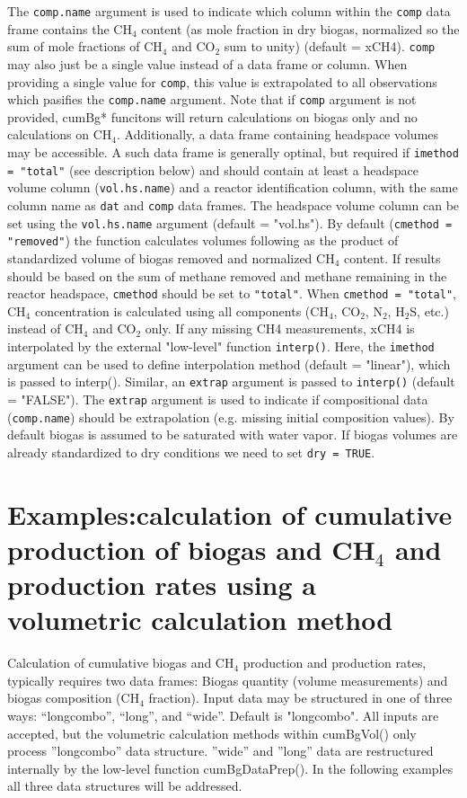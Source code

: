\documentclass{article}
\begin{document}
The \texttt{comp.name} argument is used to indicate which column within the \texttt{comp} data frame contains the CH$_4$ content (as mole fraction in dry biogas, normalized so the sum of mole fractions of CH$_4$ and CO$_2$ sum to unity) (default = xCH4). \texttt{comp} may also just be a single value instead of a data frame or column. When providing a single value for \texttt{comp}, this value is extrapolated to all observations which pasifies the \texttt{comp.name} argument. Note that if \texttt{comp} argument is not provided, cumBg* funcitons will return calculations on biogas only and no calculations on CH$_4$. 
Additionally, a data frame containing headspace volumes may be accessible. A such data frame is generally optinal, but required if \texttt{imethod = "total"} (see description below) and should contain at least a headspace volume column (\texttt{vol.hs.name}) and a reactor identification column, with the same column name as \texttt{dat} and \texttt{comp} data frames. The headspace volume column can be set using the \texttt{vol.hs.name} argument (default = "vol.hs").
By default (\texttt{cmethod = "removed"}) the function calculates volumes following \cite{richards_methods_1991} as the product of standardized volume of biogas removed and normalized CH$_4$ content. If results should be based on the sum of methane removed and methane remaining in the reactor headspace, \texttt{cmethod} should be set to \texttt{"total"}. When \texttt{cmethod = "total"}, CH$_4$ concentration is calculated using all components (CH$_4$, CO$_2$, N$_2$, H$_2$S, etc.) instead of CH$_4$ and CO$_2$ only.
If any missing CH4 measurements, xCH4 is interpolated by the external "low-level" function \texttt{interp()}. Here, the \texttt{imethod} argument can be used to define interpolation method (default = "linear"), which is passed to interp().   
Similar, an \texttt{extrap} argument is passed to \texttt{interp()} (default = "FALSE"). The \texttt{extrap} argument is used to indicate if compositional data (\texttt{comp.name}) should be extrapolation (e.g. missing initial composition values).  
By default biogas is assumed to be saturated with water vapor. If biogas volumes are already standardized to dry conditions we need to set \texttt{dry = TRUE}.

\newpage
\section{Examples:calculation of cumulative production of biogas and CH$_4$ and production rates using a volumetric calculation method}
Calculation of cumulative biogas and CH$_4$ production and production rates, typically requires two data frames: Biogas quantity (volume measurements) and biogas composition (CH$_4$ fraction).
Input data may be structured in one of three ways: ``longcombo'', ``long'', and ``wide''. Default is "longcombo". All inputs are accepted, but the volumetric calculation methods within cumBgVol() only process ''longcombo'' data structure. ''wide'' and ''long'' data are restructured internally by the low-level function cumBgDataPrep(). In the following examples all three data structures will be addressed.
\end{document}
